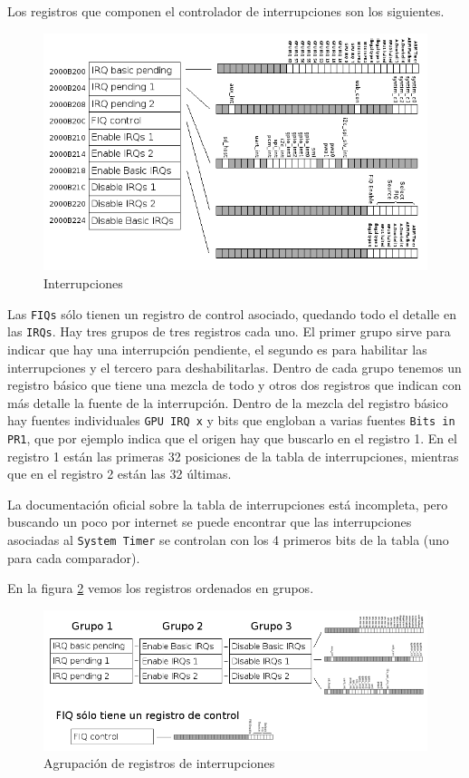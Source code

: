 Los registros que componen el controlador de interrupciones son los siguientes.

\begin{figure}[h]
  \centering
    \includegraphics[width=14cm]{graphs/interrupciones.png}
  \caption{Interrupciones}
  \label{fig:interrupciones}
\end{figure}

Las {\tt FIQs} sólo tienen un registro de control asociado, quedando todo el detalle
en las {\tt IRQs}. Hay tres grupos de tres
registros cada uno. El primer grupo sirve para indicar que hay una interrupción pendiente, el
segundo es para habilitar las interrupciones y el tercero para deshabilitarlas. Dentro de cada
grupo tenemos un registro básico que tiene una mezcla de todo y otros dos registros que
indican con más detalle la fuente de la interrupción. Dentro de la mezcla del registro básico
hay fuentes individuales {\tt GPU IRQ x} y bits que engloban a varias fuentes {\tt Bits in PR1},
que por ejemplo indica que el origen hay que buscarlo en el registro 1. En el registro 1 están
las primeras 32 posiciones de la tabla de interrupciones, mientras que en el registro 2 están
las 32 últimas.

La documentación oficial sobre la tabla de interrupciones está incompleta, pero buscando un poco
por internet se puede encontrar que las interrupciones asociadas al {\tt System Timer} se
controlan con los 4 primeros bits de la tabla (uno para cada comparador).

En la figura \ref{fig:interrupcionesgrupos} vemos los registros ordenados en grupos.

\begin{figure}[h]
  \centering
    \includegraphics[width=15cm]{graphs/interrupcionesgrupos.png}
  \caption{Agrupación de registros de interrupciones}
  \label{fig:interrupcionesgrupos}
\end{figure}

